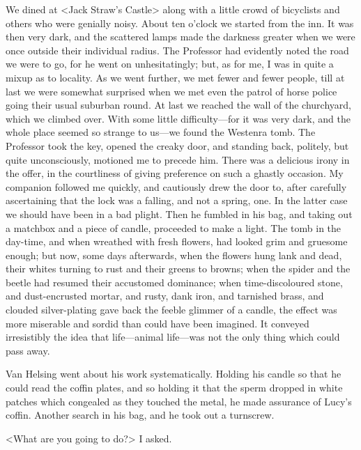 We dined at <Jack Straw's Castle> along with a little crowd of bicyclists and others who were genially noisy. About ten o'clock we started from the inn. It was then very dark, and the scattered lamps made the darkness greater when we were once outside their individual radius. The Professor had evidently noted the road we were to go, for he went on unhesitatingly; but, as for me, I was in quite a mixup as to locality. As we went further, we met fewer and fewer people, till at last we were somewhat surprised when we met even the patrol of horse police going their usual suburban round. At last we reached the wall of the churchyard, which we climbed over. With some little difficulty—for it was very dark, and the whole place seemed so strange to us—we found the Westenra tomb. The Professor took the key, opened the creaky door, and standing back, politely, but quite unconsciously, motioned me to precede him. There was a delicious irony in the offer, in the courtliness of giving preference on such a ghastly occasion. My companion followed me quickly, and cautiously drew the door to, after carefully ascertaining that the lock was a falling, and not a spring, one. In the latter case we should have been in a bad plight. Then he fumbled in his bag, and taking out a matchbox and a piece of candle, proceeded to make a light. The tomb in the day-time, and when wreathed with fresh flowers, had looked grim and gruesome enough; but now, some days afterwards, when the flowers hung lank and dead, their whites turning to rust and their greens to browns; when the spider and the beetle had resumed their accustomed dominance; when time-discoloured stone, and dust-encrusted mortar, and rusty, dank iron, and tarnished brass, and clouded silver-plating gave back the feeble glimmer of a candle, the effect was more miserable and sordid than could have been imagined. It conveyed irresistibly the idea that life—animal life—was not the only thing which could pass away.

Van Helsing went about his work systematically. Holding his candle so that he could read the coffin plates, and so holding it that the sperm dropped in white patches which congealed as they touched the metal, he made assurance of Lucy's coffin. Another search in his bag, and he took out a turnscrew.

<What are you going to do?> I asked.

